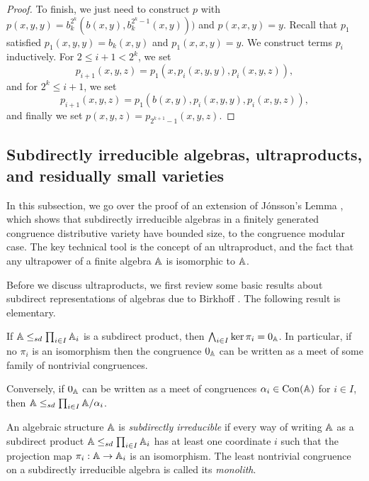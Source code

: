 \documentclass[letterpaper,11pt]{article}
\DeclareMathOperator{\Con}{Con}
\begin{document}
\begin{proof}
To finish, we just need to construct $p$ with $p(x,y,y) = b_k^{2^k}(b(x,y),b_k^{2^k-1}(x,y)))$ and $p(x,x,y) = y$. Recall that $p_1$ satisfied $p_1(x,y,y) = b_k(x,y)$ and $p_1(x,x,y) = y$. We construct terms $p_i$ inductively. For $2 \le i+1 < 2^k$, we set
\[
p_{i+1}(x,y,z) = p_1(x,p_i(x,y,y),p_i(x,y,z)),
\]
and for $2^k \le i+1$, we set
\[
p_{i+1}(x,y,z) = p_1(b(x,y),p_i(x,y,y),p_i(x,y,z)),
\]
and finally we set $p(x,y,z) = p_{2^{k+1}-1}(x,y,z)$.
\end{proof}



\subsection{Subdirectly irreducible algebras, ultraproducts, and residually small varieties}\label{s-subdirectly-irred}

In this subsection, we go over the proof of an extension of J\'onsson's Lemma \cite{jonsson-distributive}, which shows that subdirectly irreducible algebras in a finitely generated congruence distributive variety have bounded size, to the congruence modular case. The key technical tool is the concept of an ultraproduct, and the fact that any ultrapower of a finite algebra $\mathbb{A}$ is isomorphic to $\mathbb{A}$.

Before we discuss ultraproducts, we first review some basic results about subdirect representations of algebras due to Birkhoff \cite{birkhoff-subdirect}. The following result is elementary.

\begin{prop} If $\mathbb{A} \le_{sd} \prod_{i \in I} \mathbb{A}_i$ is a subdirect product, then $\bigwedge_{i \in I} \ker \pi_i = 0_{\mathbb{A}}$. In particular, if no $\pi_i$ is an isomorphism then the congruence $0_{\mathbb{A}}$ can be written as a meet of some family of nontrivial congruences.

Conversely, if $0_{\mathbb{A}}$ can be written as a meet of congruences $\alpha_i \in \Con(\bA)$ for $i \in I$, then $\mathbb{A} \le_{sd} \prod_{i \in I} \mathbb{A}/\alpha_i$.
\end{prop}

\begin{defn} An algebraic structure $\mathbb{A}$ is \emph{subdirectly irreducible} if every way of writing $\mathbb{A}$ as a subdirect product $\mathbb{A} \le_{sd} \prod_{i \in I} \mathbb{A}_i$ has at least one coordinate $i$ such that the projection map $\pi_i : \mathbb{A} \rightarrow \mathbb{A}_i$ is an isomorphism. The least nontrivial congruence on a subdirectly irreducible algebra is called its \emph{monolith}.
\end{defn}
\end{document}
